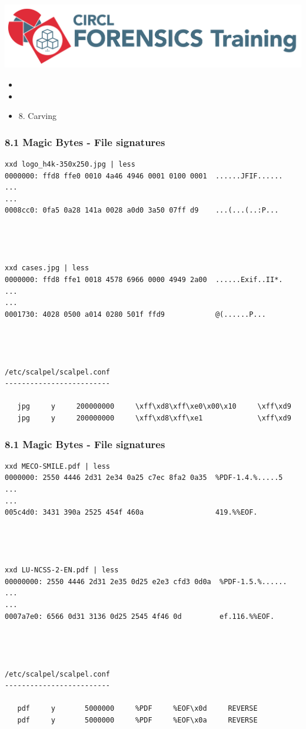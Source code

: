 

\begin{frame}
    \includegraphics[scale=0.3]{images/logo-circl-Forensics.png}
    \begin{itemize}
        \item[]
        \item[]
        \item[] 8. Carving
    \end{itemize}
\end{frame}


\begin{frame}[fragile]
  \frametitle{8.1 Magic Bytes - File signatures}
  \begin{lstlisting}[basicstyle=\tiny]
xxd logo_h4k-350x250.jpg | less
0000000: ffd8 ffe0 0010 4a46 4946 0001 0100 0001  ......JFIF......
...
...
0008cc0: 0fa5 0a28 141a 0028 a0d0 3a50 07ff d9    ...(...(..:P...




xxd cases.jpg | less
0000000: ffd8 ffe1 0018 4578 6966 0000 4949 2a00  ......Exif..II*.
...
...
0001730: 4028 0500 a014 0280 501f ffd9            @(......P...




/etc/scalpel/scalpel.conf
-------------------------

   jpg     y     200000000     \xff\xd8\xff\xe0\x00\x10     \xff\xd9
   jpg     y     200000000     \xff\xd8\xff\xe1             \xff\xd9

  \end{lstlisting}
\end{frame}


\begin{frame}[fragile]
  \frametitle{8.1 Magic Bytes - File signatures}
  \begin{lstlisting}[basicstyle=\tiny]
xxd MECO-SMILE.pdf | less
0000000: 2550 4446 2d31 2e34 0a25 c7ec 8fa2 0a35  %PDF-1.4.%.....5
...
...
005c4d0: 3431 390a 2525 454f 460a                 419.%%EOF.




xxd LU-NCSS-2-EN.pdf | less
00000000: 2550 4446 2d31 2e35 0d25 e2e3 cfd3 0d0a  %PDF-1.5.%......
...
...
0007a7e0: 6566 0d31 3136 0d25 2545 4f46 0d         ef.116.%%EOF.




/etc/scalpel/scalpel.conf
-------------------------

   pdf     y       5000000     %PDF     %EOF\x0d     REVERSE
   pdf     y       5000000     %PDF     %EOF\x0a     REVERSE

  \end{lstlisting}
\end{frame}


